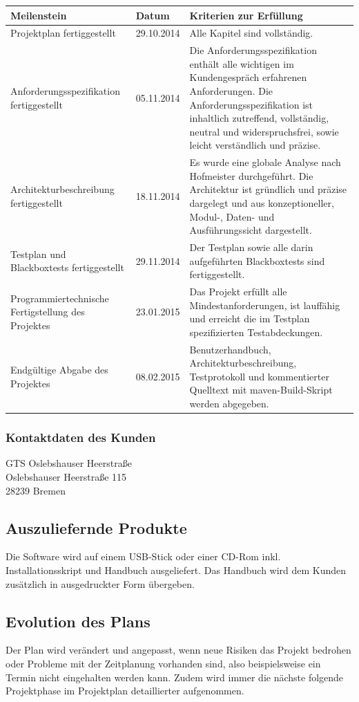 \documentclass[fontsize=12pt,paper=a4,twoside]{scrartcl}
\begin{document}
\begin{tabularx}{\textwidth}{|p{5cm}|p{2cm}|X|}
\hline \textbf{Meilenstein} & \textbf{Datum} & \textbf{Kriterien zur Erfüllung} \\
\hline Projektplan fertiggestellt & 29.10.2014 & Alle Kapitel sind vollständig. \\
\hline Anforderungsspezifikation fertiggestellt & 05.11.2014 & Die Anforderungsspezifikation enthält alle wichtigen im Kundengespräch erfahrenen Anforderungen. Die Anforderungsspezifikation ist inhaltlich zutreffend, vollständig, neutral und widerspruchsfrei, sowie leicht verständlich und präzise.\\
\hline Architekturbeschreibung fertiggestellt & 18.11.2014 & Es wurde eine globale Analyse nach Hofmeister durchgeführt. Die Architektur ist gründlich und präzise dargelegt und aus konzeptioneller, Modul-, Daten- und Ausführungssicht dargestellt.   \\
\hline Testplan und Blackboxtests fertiggestellt & 29.11.2014 & Der Testplan sowie alle darin aufgeführten Blackboxtests sind fertiggestellt.\\
\hline Programmiertechnische Fertigstellung des Projektes & 23.01.2015 & Das Projekt erfüllt alle Mindestanforderungen, ist lauffähig und erreicht die im Testplan spezifizierten Testabdeckungen.\\
\hline Endgültige Abgabe des Projektes & 08.02.2015 & Benutzerhandbuch, Architekturbeschreibung, Testprotokoll und kommentierter Quelltext mit maven-Build-Skript werden abgegeben. \\
\hline
\end{tabularx}

\subsubsection{Kontaktdaten des Kunden}
GTS Oslebshauser Heerstraße \\
Oslebshauser Heerstraße 115\\
28239 Bremen \\


\subsection{Auszuliefernde Produkte}
Die Software wird auf einem USB-Stick oder einer CD-Rom inkl. Installationsskript und Handbuch ausgeliefert. Das Handbuch wird dem Kunden zusätzlich in ausgedruckter Form übergeben. 

\subsection{Evolution des Plans}
Der Plan wird verändert und angepasst, wenn neue Risiken das Projekt bedrohen oder Probleme mit der Zeitplanung vorhanden sind, also beispielsweise ein Termin nicht eingehalten werden kann. Zudem wird immer die nächste folgende Projektphase im Projektplan detaillierter aufgenommen.
\end{document}
